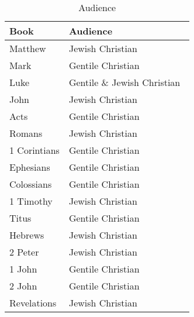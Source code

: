 \documentclass{article}
\begin{document}
\begin{table}
    \centering
    \renewcommand\arraystretch{1.3}
    \begin{tabular}{@{}ll@{}}
    \toprule
        Book & Audience \\
    \midrule
        Matthew & Jewish Christian~\cite{Saldarini2003} \\
        Mark & Gentile Christian~\cite{Schroter2010} \\
        Luke & Gentile \& Jewish Christian~\cite{Thompson2010} \\
        John & Jewish Christian \\
        Acts & Gentile Christian \\
        Romans & Jewish Christian \\
        1 Corintians & Gentile Christian \\
        Ephesians & Gentile Christian~\cite{Marshall2003} \\
        Colossians & Gentile Christian~\cite{Hooker2003} \\
        1 Timothy & Jewish Christian \\
        Titus & Gentile Christian~\cite{Perkins2003} \\
        Hebrews & Jewish Christian~\cite{Thiselton2003} \\
        2 Peter & Jewish Christian \\
        1 John & Gentile Christian~\cite{Painter2003} \\
        2 John & Gentile Christian~\cite{Painter2003} \\
        Revelations & Jewish Christian \\
    \bottomrule
    \end{tabular}
    \caption{Audience}
    \label{audience}
\end{table}
\end{document}
